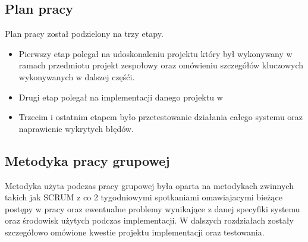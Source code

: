 \subsection{Plan pracy}
Plan pracy został podzielony na trzy etapy. 
\begin{itemize}
\item Pierwszy  etap polegał na udoskonaleniu projektu który był wykonywany w ramach przedmiotu projekt zespołowy  oraz omówieniu szczegółów kluczowych wykonywanych w dalszej częśći.

\item Drugi etap polegał na implementacji danego projektu w 

\item Trzecim i ostatnim etapem było przetestowanie  działania całego systemu oraz naprawienie wykrytych błędów.
\end{itemize}
\subsection{Metodyka pracy grupowej}
Metodyka użyta  podczas pracy grupowej była oparta na metodykach zwinnych takich jak SCRUM z co 2 tygodniowymi spotkaniami omawiajacymi bieżące postępy w pracy oraz ewentualne problemy wynikające z danej specyfiki systemu oraz środowisk użytych podczas implementacji. W dalszych rozdziałach zostały szczegółowo omówione kwestie projektu implementacji oraz testowania.
